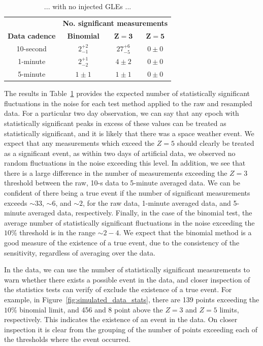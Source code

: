 \begin{table}[ht!]
	\begin{center}
		\caption{... with no injected GLEs ...}
		\label{tab:HS_14008_sims_zeros}
		\begin{tabular}{c c c c}
			\hline 
			{} & \multicolumn{3}{c}{\bf No. significant measurements} \\ 
			{\bf Data cadence} & {\bf Binomial} & {\bf $\mathbf{Z=3}$} & {\bf $\mathbf{Z=5}$}  \\ 
			\hline 
			10-second & $2^{+2}_{-1}$ & $27^{+6}_{-5}$ & $0 \pm 0$ \\ 
			1-minute & $2^{+1}_{-2}$ & $4 \pm 2$ & $0 \pm 0$ \\ 
			5-minute & $1 \pm 1$ & $1 \pm 1$ & $0 \pm 0$ \\ 
			\hline 
		\end{tabular} 
	\end{center}
\end{table}

The results in Table~\ref{tab:HS_14008_sims_zeros} provides the expected number of statistically significant fluctuations in the noise for each test method applied to the raw and resampled data. For a particular two day observation, we can say that any epoch with statistically significant peaks in excess of these values can be treated as statistically significant, and it is likely that there was a space weather event. We expect that any measurements which exceed the $Z=5$ should clearly be treated as a significant event, as within two days of artificial data, we observed no random fluctuations in the noise exceeding this level. In addition, we see that there is a large difference in the number of measurements exceeding the $Z=3$ threshold between the raw, 10-s data to 5-minute averaged data. We can be confident of there being a true event if the number of significant measurements exceeds $\sim 33$, $\sim 6$, and $\sim 2$, for the raw data, 1-minute averaged data, and 5-minute averaged data, respectively. Finally, in the case of the binomial test, the average number of statistically significant fluctuations in the noise exceeding the $10 \%$ threshold is in the range $\sim 2-4$. We expect that the binomial method is a good measure of the existence of a true event, due to the consistency of the sensitivity, regardless of averaging over the data. 

In the data, we can use the number of statistically significant measurements to warn whether there exists a possible event in the data, and closer inspection of the statistics tests can verify of exclude the existence of a true event. For example, in Figure~\ref{fig:simulated_data_stats}, there are 139 points exceeding the $10 \%$ binomial limit, and 456 and 8 point above the $Z=3$ and $Z=5$ limits, respectively. This indicates the existence of an event in the data. On closer inspection it is clear from the grouping of the number of points exceeding each of the thresholds where the event occurred.

